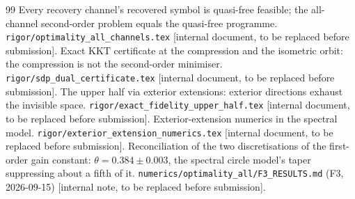 \documentclass[11pt,a4paper]{article}
\theoremstyle{definition}\newtheorem{definition}[theorem]{Definition}\newtheorem{remark}[theorem]{Remark}
\begin{document}
\begin{thebibliography}{99}
 Every recovery channel's recovered symbol is quasi-free feasible; the all-channel second-order problem equals the quasi-free programme. \texttt{rigor/optimality\_all\_channels.tex} [internal document, to be replaced before submission].
 Exact KKT certificate at the compression and the isometric orbit: the compression is not the second-order minimiser. \texttt{rigor/sdp\_dual\_certificate.tex} [internal document, to be replaced before submission].
 The upper half via exterior extensions: exterior directions exhaust the invisible space. \texttt{rigor/exact\_fidelity\_upper\_half.tex} [internal document, to be replaced before submission].
 Exterior-extension numerics in the spectral model. \texttt{rigor/exterior\_extension\_numerics.tex} [internal document, to be replaced before submission].
 Reconciliation of the two discretisations of the first-order gain constant: $\theta=0.384\pm0.003$, the spectral circle model's taper suppressing about a fifth of it. \texttt{numerics/optimality\_all/F3\_RESULTS.md} (F3, 2026-09-15) [internal note, to be replaced before submission].
\end{thebibliography}
\end{document}
